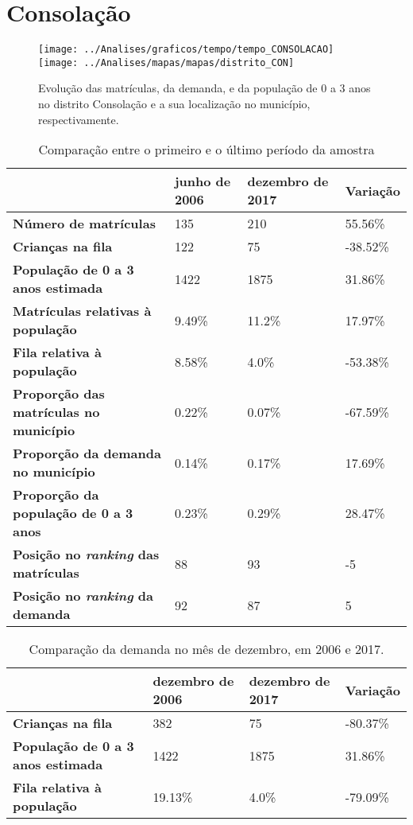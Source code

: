 \section{Consolação}
\begin{figure}[H]
\centering
\texttt{[image: ../Analises/graficos/tempo/tempo\_CONSOLACAO]}
\texttt{[image: ../Analises/mapas/mapas/distrito\_CON]}
\caption{Evolução das matrículas, da demanda, e da população de 0 a 3 anos no distrito Consolação e a sua localização no município, respectivamente.}
\end{figure}
\begin{table}[H]
\begin{tabular}{l|l|l|l}
\textbf{}                                      & \textbf{junho de 2006}       & \textbf{dezembro de 2017}    & \textbf{Variação} \\ \hline
\textbf{Número de matrículas}                  & 135 & 210 & 55.56\% \\ \hline
\textbf{Crianças na fila}                      & 122 & 75 & -38.52\% \\ \hline
\textbf{População de 0 a 3 anos estimada}      & 1422 & 1875 & 31.86\% \\ \hline
\textbf{Matrículas relativas à população}      & 9.49\% & 11.2\% & 17.97\% \\ \hline
\textbf{Fila relativa à população}             & 8.58\% & 4.0\% & -53.38\% \\ \hline
\textbf{Proporção das matrículas no município} & 0.22\% & 0.07\% & -67.59\% \\ \hline
\textbf{Proporção da demanda no município}     & 0.14\% & 0.17\% & 17.69\% \\ \hline
\textbf{Proporção da população de 0 a 3 anos}  & 0.23\% & 0.29\% & 28.47\% \\ \hline
\textbf{Posição no \textit{ranking} das matrículas}     & 88 & 93 & -5 \\ \hline
\textbf{Posição no \textit{ranking} da demanda}         & 92 & 87 & 5 \\ 
\end{tabular}
\caption{Comparação entre o primeiro e o último período da amostra}
\end{table}
\begin{table}[H]
\begin{tabular}{l|l|l|l}
\textbf{}                                 & \textbf{dezembro de 2006} & \textbf{dezembro de 2017} & \textbf{Variação} \\ \hline
\textbf{Crianças na fila}                      & 382 & 75 & -80.37\% \\ \hline
\textbf{População de 0 a 3 anos estimada}      & 1422 & 1875 & 31.86\% \\ \hline
\textbf{Fila relativa à população}             & 19.13\% & 4.0\% & -79.09\% \\
\end{tabular}
\caption{Comparação da demanda no mês de dezembro, em 2006 e 2017.}
\end{table}
